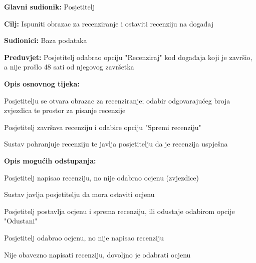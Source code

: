 					\noindent {}
\begin{packed_item}
	\item \textbf{Glavni sudionik:} Posjetitelj
	\item  \textbf{Cilj:} Ispuniti obrazac za recenziranje i ostaviti recenziju na događaj
	\item  \textbf{Sudionici:} Baza podataka
	\item  \textbf{Preduvjet:} Posjetitelj odabrao opciju "Recenziraj" kod događaja koji je završio, a nije prošlo 48 sati od njegovog završetka
	\item  \textbf{Opis osnovnog tijeka:}
	
	\item[] \begin{packed_enum}
		
		\item Posjetitelju se otvara obrazac za recenziranje; odabir odgovarajućeg broja zvjezdica te prostor za pisanje recenzije
		\item Posjetitelj završava recenziju i odabire opciju "Spremi recenziju"
		\item Sustav pohranjuje recenziju te javlja posjetitelju da je recenzija uspješna
	\end{packed_enum}
	
	\item  \textbf{Opis mogućih odstupanja:}
	
	\item[] \begin{packed_item}
		
		\item[2.a] Posjetitelj napisao recenziju, no nije odabrao ocjenu (zvjezdice)
		\item[] \begin{packed_enum}
			
			\item Sustav javlja posjetitelju da mora ostaviti ocjenu
			\item Posjetitelj postavlja ocjenu i sprema recenziju, ili odustaje odabirom opcije "Odustani"
			
		\end{packed_enum}
		\item[2.b] Posjetitelj odabrao ocjenu, no nije napisao recenziju
			\item[] \begin{packed_enum}
			
			\item Nije obavezno napisati recenziju, dovoljno je odabrati ocjenu
			
		\end{packed_enum}
		
	\end{packed_item}
\end{packed_item}

